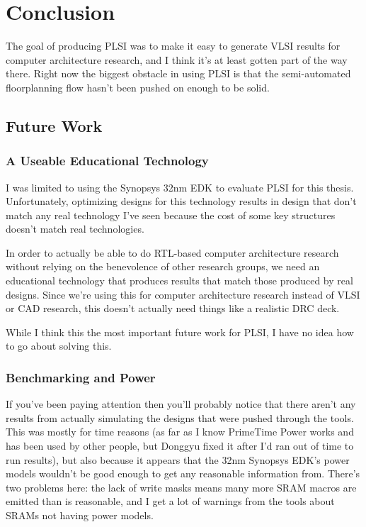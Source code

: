 \documentclass{article}
\begin{document}
\chapter{Conclusion}

The goal of producing PLSI was to make it easy to generate VLSI results for
computer architecture research, and I think it's at least gotten part of the
way there.  Right now the biggest obstacle in using PLSI is that the
semi-automated floorplanning flow hasn't been pushed on enough to be solid.

\section{Future Work}

\subsection{A Useable Educational Technology}

I was limited to using the Synopsys 32nm EDK to evaluate PLSI for this thesis.
Unfortunately, optimizing designs for this technology results in design that
don't match any real technology I've seen because the cost of some key
structures doesn't match real technologies.

In order to actually be able to do RTL-based computer architecture research
without relying on the benevolence of other research groups, we need an
educational technology that produces results that match those produced by real
designs.  Since we're using this for computer architecture research instead of
VLSI or CAD research, this doesn't actually need things like a realistic DRC
deck.

While I think this the most important future work for PLSI, I have no idea how
to go about solving this.

\subsection{Benchmarking and Power}

If you've been paying attention then you'll probably notice that there aren't
any results from actually simulating the designs that were pushed through the
tools.  This was mostly for time reasons (as far as I know PrimeTime Power
works and has been used by other people, but Donggyu fixed it after I'd ran out
of time to run results), but also because it appears that the 32nm Synopsys
EDK's power models wouldn't be good enough to get any reasonable information
from.  There's two problems here: the lack of write masks means many more SRAM
macros are emitted than is reasonable, and I get a lot of warnings from the
tools about SRAMs not having power models.
\end{document}
